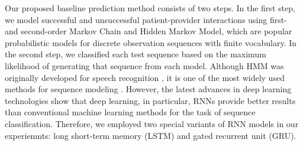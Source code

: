 \documentclass{amia_summit_2018}
\begin{document}
Our proposed baseline prediction method consists of two steps. In the first step, we model successful and unsuccessful patient-provider interactions using first- and second-order Markov Chain and Hidden Markov Model, which are popular probabilistic models for discrete observation sequences with finite vocabulary. In the second step, we classified each test sequence based on the maximum likelihood of generating that sequence from each model. Although HMM was originally developed for speech recognition \cite{rabiner1989tutorial}, it is one of the most widely used methods for sequence modeling \cite{mutsam2016maximum, eickeler1998hidden, srivastava2007hmm, won2004training, chai2001folk}. However, the latest advances in deep learning technologies show that deep learning, in particular, RNNs provide better results than conventional machine learning methods for the task of sequence classification. Therefore, we employed two special variants of RNN models in our experiemnts: long short-term memory (LSTM) and gated recurrent unit (GRU).
\end{document}
